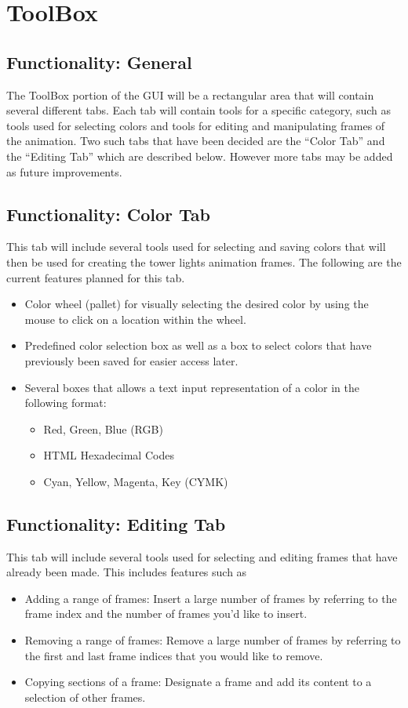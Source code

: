 \documentclass{article}
\begin{document}
	\section{ToolBox} \label{toolbox}
	
	\subsection{Functionality: General}
	The ToolBox portion of the GUI will be a rectangular area that will contain several different tabs. Each tab will contain tools for a specific category, such as tools used for selecting colors and tools for editing and manipulating frames of the animation. Two such tabs that have been decided are the “Color Tab” and the “Editing Tab” which are described below. However more tabs may be added as future improvements.
	\subsection{Functionality: Color Tab}
This tab will include several tools used for selecting and saving colors that will then be used for creating the tower lights animation frames. The following are the current features planned for this tab.
	\begin{itemize}
			\item Color wheel (pallet) for visually selecting the desired color by using the mouse to click on a location within the wheel.
			\item Predefined color selection box as well as a box to select colors that have previously been saved for easier access later.
			\item Several  boxes that allows a text input representation of a color in the following format:
		\begin{itemize}
				\item Red, Green, Blue (RGB)
				\item HTML Hexadecimal Codes
				\item Cyan, Yellow, Magenta, Key (CYMK)
		\end{itemize}
	\end{itemize}

	\subsection{Functionality: Editing Tab}
	This tab will include several tools used for selecting and editing frames that have already been made. This includes features such as
	\begin{itemize}
			\item Adding a range of frames: Insert a large number of frames by referring to the frame index and the number of frames you'd like to insert.
			\item Removing a range of frames: Remove a large number of frames by referring to the first and last frame indices that you would like to remove.
			\item Copying sections of a frame: Designate a frame and add its content to a selection of other frames.
	\end{itemize}
	
\end{document}

